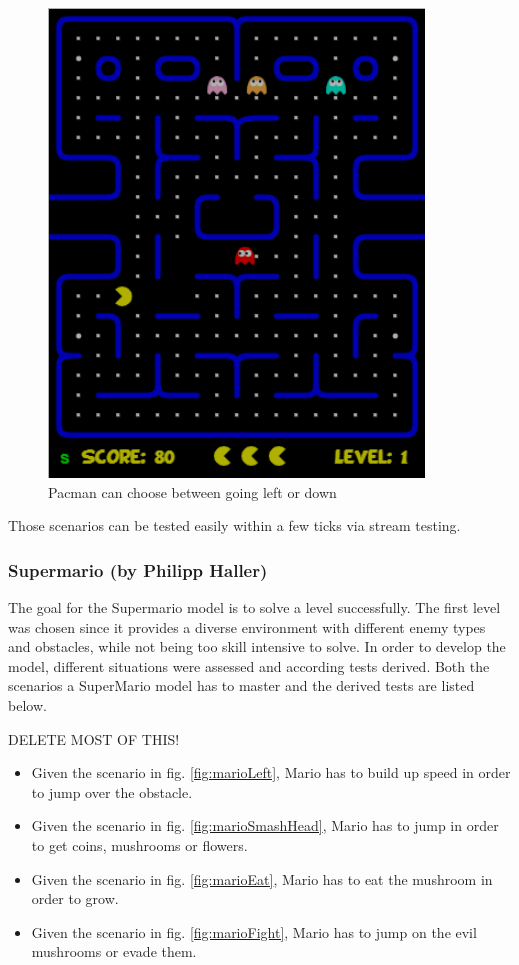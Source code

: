 \begin{figure}[!h]
	\centering
	\includegraphics[scale=0.55]{pictures/Pacman_Condition6.PNG}
	\caption{Pacman can choose between going left or down}
	\label{fig:pacmanCookie}
\end{figure}

Those scenarios can be tested easily within a few ticks via stream testing.

\subsubsection{Supermario (by Philipp Haller)}

The goal for the Supermario model is to solve a level successfully. The first level was chosen since it provides a diverse environment with different enemy types and obstacles, while not being too skill intensive to solve. 
In order to develop the model, different situations were assessed and according tests derived. Both the scenarios a SuperMario model has to master and the derived tests are listed below.


DELETE MOST OF THIS!
\begin{itemize}
	\item Given the scenario in fig. \ref{fig:marioLeft}, Mario has to build up speed in order to jump over the obstacle.
	\item Given the scenario in fig. \ref{fig:marioSmashHead}, Mario has to jump in order to get coins, mushrooms or flowers.
	\item Given the scenario in fig. \ref{fig:marioEat}, Mario has to eat the mushroom in order to grow.
	\item Given the scenario in fig. \ref{fig:marioFight}, Mario has to jump on the evil mushrooms or evade them.
\end{itemize}

